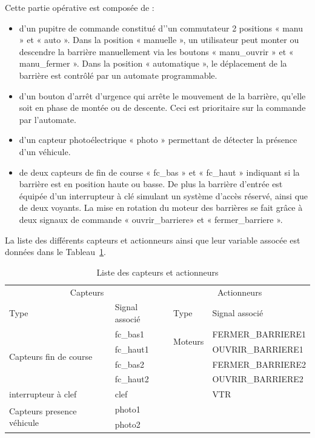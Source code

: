 \documentclass[11pt, multicol]{article}
\begin{document}
Cette partie opérative est composée de :
\begin{itemize}
	\item d’un pupitre de commande constitué d’’un commutateur 2 positions « manu » et « auto ». Dans la position
	« manuelle », un utilisateur peut monter ou descendre la barrière manuellement via les boutons
	« manu\_ouvrir » et « manu\_fermer ». Dans la position « automatique », le déplacement de la barrière est
	contrôlé par un automate programmable.
	\item d’un bouton d’arrêt d’urgence qui arrête le mouvement de la barrière, qu’elle soit en phase de montée ou de
	descente. Ceci est prioritaire sur la commande par l’automate.
	\item d’un capteur photoélectrique « photo » permettant de détecter la présence d’un véhicule.
 	\item de deux capteurs de fin de course « fc\_bas » et « fc\_haut » indiquant si la barrière est en position haute ou
	basse.
	De plus la barrière d’entrée est équipée d’un interrupteur à clé simulant un système d’accès réservé, ainsi que
	de deux voyants.
	La mise en rotation du moteur des barrières se fait grâce à deux signaux de commande « ouvrir\_barriere» et
	« fermer\_barriere ».

\end{itemize}

La liste des différents capteurs et actionneurs ainsi que leur variable assocée est données dans le Tableau~\ref{tab:capteursActionneurs}.

\begin{table}[ht]
\centering
	\begin{tabular}{|ll || ll|}
	\hline
		\multicolumn{2}{|c||}{Capteurs} 				    & \multicolumn{2}{c|}{Actionneurs}                        \\
		Type                                        & Signal associé & Type                     & Signal associé    \\\hline
		\multirow{4}{*}{Capteurs fin de course}     & fc\_bas1       & \multirow{2}{*}{Moteurs} & FERMER\_BARRIERE1 \\
		                                            & fc\_haut1      &                          & OUVRIR\_BARRIERE1 \\
		                                            & fc\_bas2       &                          & FERMER\_BARRIERE2 \\
																						    & fc\_haut2		   &                          & OUVRIR\_BARRIERE2 \\\hline
  	interrupteur à clef											    & clef					 &                          & VTR               \\\hline
		\multirow{3}{*}{Capteurs presence véhicule} & photo1         &                          &                   \\
		                                            & photo2         &                          &                   \\\hline
	\end{tabular}
	\caption{Liste des capteurs et actionneurs}
	\label{tab:capteursActionneurs}
\end{table}
\end{document}
